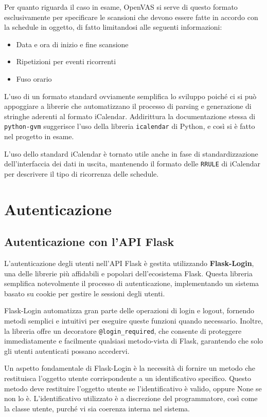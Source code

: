 Per quanto riguarda il caso in esame, OpenVAS si serve di questo formato esclusivamente per specificare le scansioni che devono essere fatte in accordo con la schedule in oggetto, di fatto limitandosi alle seguenti informazioni:
\begin{itemize}
    \item Data e ora di inizio e fine scansione
    \item Ripetizioni per eventi ricorrenti
    \item Fuso orario
\end{itemize}

L'uso di un formato standard ovviamente semplifica lo sviluppo poiché ci si può appoggiare a librerie che automatizzano il processo di parsing e generazione di stringhe aderenti al formato iCalendar. Addirittura la documentazione stessa di \texttt{python-gvm} suggerisce l'uso della libreria \texttt{icalendar} di Python, e così si è fatto nel progetto in esame.

L'uso dello standard iCalendar è tornato utile anche in fase di standardizzazione dell'interfaccia dei dati in uscita, mantenendo il formato delle \texttt{RRULE} di iCalendar per descrivere il tipo di ricorrenza delle schedule.

\section{Autenticazione}
\subsection{Autenticazione con l'API Flask}
L'autenticazione degli utenti nell'API Flask è gestita utilizzando \textbf{Flask-Login}, una delle librerie più affidabili e popolari dell'ecosistema Flask. Questa libreria semplifica notevolmente il processo di autenticazione, implementando un sistema basato su cookie per gestire le sessioni degli utenti.

Flask-Login automatizza gran parte delle operazioni di login e logout, fornendo metodi semplici e intuitivi per eseguire queste funzioni quando necessario. Inoltre, la libreria offre un decoratore \texttt{@login\_required}, che consente di proteggere immediatamente e facilmente qualsiasi metodo-vista di Flask, garantendo che solo gli utenti autenticati possano accedervi.

Un aspetto fondamentale di Flask-Login è la necessità di fornire un metodo che restituisca l'oggetto utente corrispondente a un identificativo specifico. Questo metodo deve restituire l'oggetto utente se l'identificativo è valido, oppure None se non lo è. L'identificativo utilizzato è a discrezione del programmatore, così come la classe utente, purché vi sia coerenza interna nel sistema.

